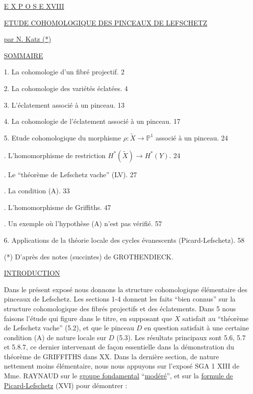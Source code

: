 


\underline{E X P O S E XVIII}


\underline{\underline{ETUDE COHOMOLOGIQUE DES PINCEAUX DE LEFSCHETZ}}


\underline{par N. Katz (*)}


\underline{SOMMAIRE}

1. La cohomologie d'un fibré projectif. \hfill 2

2. La cohomologie des variétés éclatées. \hfill 4

3. L'éclatement associé à un pinceau. \hfill 13

4. La cohomologie de l'éclatement associé à un pinceau. \hfill 17

5. Etude cohomologique du morphisme $\rho : \widetilde{X} \longrightarrow \mathbb{P}^{1}$ associé à un pinceau. \hfill 24

. L'homomorphisme de restriction $H^{*}(\widetilde{X}) \longrightarrow H^{*}(Y)$. \hfill 24

. Le ``théorème de Lefschetz vache'' (LV). \hfill 27

. La condition (A). \hfill 33

. L'homomorphisme de Griffiths. \hfill 47

. Un exemple où l'hypothèse (A) n'est pas vérifié. \hfill 57

6. Applications de la théorie locale des cycles évanescents (Picard-Lefschetz). \hfill 58

(*) D'après des notes (succintes) de GROTHENDIECK.




\underline{INTRODUCTION}

Dans le présent exposé nous donnons la structure cohomologique élémentaire des pinceaux de Lefschetz. Les sections 1-4 donnent les faits ``bien connus'' sur la structure cohomologique des fibrés projectifs et des éclatements. Dans 5 nous faisons l'étude qui figure dans le titre, en supposant que $X$ satisfait au ``théorème de Lefschetz vache'' (5.2), et que le pinceau $D$ en question satisfait à une certaine condition (A) de nature locale sur $D$ (5.3). Les résultats principaux sont 5.6, 5.7 et 5.8.7, ce  dernier intervenant de façon essentielle dans la démonstration du théorème de GRIFFITHS dans XX. Dans la dernière section, de nature nettement moins élémentaire, nous nous appuyons sur l'exposé SGA 1 XIII de Mme. RAYNAUD sur le \underline{groupe fondamental} ``\underline{modéré}'', et sur la \underline{formule de Picard-Lefschetz} (XVI) pour démontrer :

